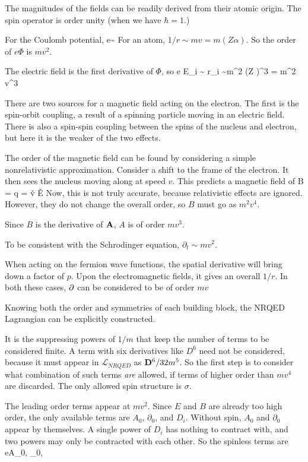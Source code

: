 The magnitudes of the fields can be readily derived from their atomic origin.  The spin operator is order unity (when we have $\hbar=1$.)

For the Coulomb potential, 
\beq
	e\Phi \sim {}
\eeq
For an atom, $1/r \sim mv = m (Z\alpha)$.  So the order of $e\Phi$ is $mv^2$.

The electric field is the first derivative of $\Phi$, so 
\beq
	e E_i \sim {} r_i \sim m^2 (Z \alpha)^3 = m^2 v^3
\eeq

There are two sources for a magnetic field acting on the electron. The first is the spin-orbit coupling, a result of a spinning particle moving in an electric field.  There is also a spin-spin coupling between the spins of the nucleus and electron, but here it is the weaker of the two effects.

The order of the magnetic field can be found by considering a simple nonrelativistic approximation.  Consider a shift to the frame of the electron.  It then sees the nucleus moving along at speed $v$.  This predicts a magnetic field of 
\beq
	B = q   = \v{v} \times \v{E} 
\eeq
Now, this is not truly accurate, because relativistic effects are ignored.  However, they do not change the overall order, so $B$ must go as $m^2v^4$.

Since $B$ is the derivative of $\mathbf{A}$, $A$ is of order $mv^3$.

To be consistent with the Schrodinger equation, $\partial_t \sim mv^2$.

When acting on the fermion wave functions, the spatial derivative will bring down a factor of $p$.  Upon the electromagnetic fields, it gives an overall $1/r$.  In both these cases, $\mathbf{\partial}$ can be considered to be of order $mv$



Knowing both the order and symmetries of each building block, the NRQED Lagrangian can be explicitly constructed.

It is the suppressing powers of $1/m$ that keep the number of terms to be considered finite.  A term with six derivatives like $D^6$ need not be considered, because it must appear in $\mathcal{L}_{NRQED}$ as $\mathbf{D}^6 / 32m^5$.  So the first step is to consider what combination of such terms \emph{are} allowed, if terms of higher order than $mv^4$ are discarded.  The only allowed spin structure is $\sigma$.

The leading order terms appear at $mv^2$.  Since $E$ and $B$ are already too high order, the only available terms are $A_0$, $\partial_0$, and $D_i$.  
Without spin, $A_0$ and $\partial_0$ appear by themselves.  A single power of $D_i$ has nothing to contract with, and two powers may only be contracted with each other.  So the spinless terms are
\beq
	eA_0, \;  \partial_0,  \; 
\eeq

